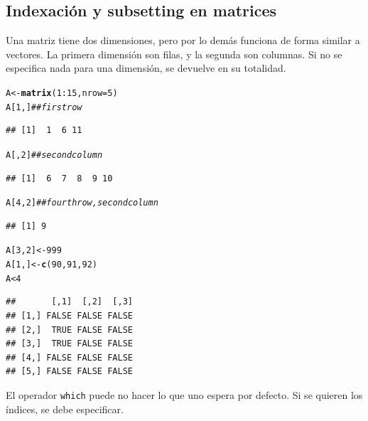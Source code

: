 \documentclass{config/apuntes}\usepackage[]{graphicx}\usepackage[]{xcolor}
\makeatletter
\newcommand{\hlnum}[1]{\textcolor[rgb]{0.686,0.059,0.569}{#1}}%
\newcommand{\hlcom}[1]{\textcolor[rgb]{0.678,0.584,0.686}{\textit{#1}}}%
\newcommand{\hlopt}[1]{\textcolor[rgb]{0,0,0}{#1}}%
\newcommand{\hldef}[1]{\textcolor[rgb]{0.345,0.345,0.345}{#1}}%
\newcommand{\hlkwb}[1]{\textcolor[rgb]{0.69,0.353,0.396}{#1}}%
\newcommand{\hlkwc}[1]{\textcolor[rgb]{0.333,0.667,0.333}{#1}}%
\newcommand{\hlkwd}[1]{\textcolor[rgb]{0.737,0.353,0.396}{\textbf{#1}}}%
\newenvironment{kframe}{%
 \def\at@end@of@kframe{}%
 \ifinner\ifhmode%
  \def\at@end@of@kframe{\end{minipage}}%
  \begin{minipage}{\columnwidth}%
 \fi\fi%
 \def\FrameCommand##1{\hskip\@totalleftmargin \hskip-\fboxsep
 \colorbox{shadecolor}{##1}\hskip-\fboxsep
     \hskip-\linewidth \hskip-\@totalleftmargin \hskip\columnwidth}%
 \MakeFramed {\advance\hsize-\width
   \@totalleftmargin\z@ \linewidth\hsize
   \@setminipage}}%
 {\par\unskip\endMakeFramed%
 \at@end@of@kframe}
\newenvironment{knitrout}{}{} %
\newcommand{\code}[1]{\texttt{#1}}
\makeatother
\begin{document}
\subsection{Indexación y subsetting en matrices}
Una matriz tiene dos dimensiones, pero por lo demás funciona de forma similar a vectores. La primera dimensión son filas, y la segunda son columnas. Si no se especifica nada para una dimensión, se devuelve en su totalidad.
\begin{knitrout}
\color{fgcolor}\begin{kframe}
\begin{alltt}
\hldef{A} \hlkwb{<-} \hlkwd{matrix}\hldef{(}\hlnum{1}\hlopt{:}\hlnum{15}\hldef{,} \hlkwc{nrow} \hldef{=} \hlnum{5}\hldef{)}
\hldef{A[}\hlnum{1}\hldef{, ]} \hlcom{## first row}
\end{alltt}
\begin{verbatim}
## [1]  1  6 11
\end{verbatim}
\begin{alltt}
\hldef{A[,} \hlnum{2}\hldef{]} \hlcom{## second column}
\end{alltt}
\begin{verbatim}
## [1]  6  7  8  9 10
\end{verbatim}
\begin{alltt}
\hldef{A[}\hlnum{4}\hldef{,} \hlnum{2}\hldef{]} \hlcom{## fourth row, second column}
\end{alltt}
\begin{verbatim}
## [1] 9
\end{verbatim}
\begin{alltt}
\hldef{A[}\hlnum{3}\hldef{,} \hlnum{2}\hldef{]} \hlkwb{<-} \hlnum{999}
\hldef{A[}\hlnum{1}\hldef{, ]} \hlkwb{<-} \hlkwd{c}\hldef{(}\hlnum{90}\hldef{,} \hlnum{91}\hldef{,} \hlnum{92}\hldef{)}
\hldef{A} \hlopt{<} \hlnum{4}
\end{alltt}
\begin{verbatim}
##       [,1]  [,2]  [,3]
## [1,] FALSE FALSE FALSE
## [2,]  TRUE FALSE FALSE
## [3,]  TRUE FALSE FALSE
## [4,] FALSE FALSE FALSE
## [5,] FALSE FALSE FALSE
\end{verbatim}
\end{kframe}
\end{knitrout}

El operador \code{which} puede no hacer lo que uno espera por defecto. Si se quieren los índices, se debe especificar.
\end{document}
